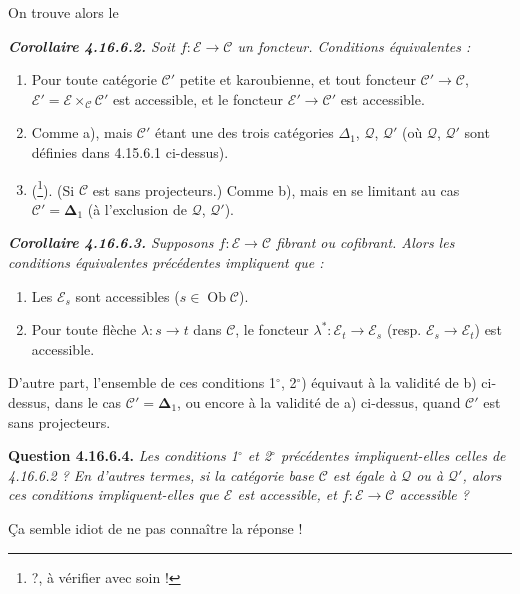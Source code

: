 \documentclass[11pt]{article}
\newcommand{\printedpage}[1]{\marginpar{\footnotesize p.~#1}}
\newcommand{\msp}[1]{\marginpar{\footnotesize [#1]}}
\newcommand{\Ob}{\operatorname{Ob}}
\newcommand{\cE}{\mathcal{E}}
\newcommand{\cC}{\mathcal{C}}
\newcommand{\cQ}{\mathcal{Q}}
\begin{document}
\setcounter{footnote}{195}

\printedpage{184}

\msp{page 475}
On trouve alors le

\begingroup\itshape
\noindent\textbf{\upshape Corollaire 4.16.6.2.} Soit $f : \cE \longrightarrow \cC$ un foncteur. Conditions équivalentes :
\begin{enumerate}[label={}]
\item[a)] Pour toute catégorie $\cC'$ \textup{petite} et \textup{karoubienne}, et tout foncteur $\cC' \longrightarrow \cC$, $\cE' = \cE \times_{\cC} \cC'$ est accessible, et le foncteur $\cE' \longrightarrow \cC'$ est accessible.
\item[b)] Comme a), mais $\cC'$ étant une des trois catégories $\Delta_1$, $\cQ$, $\cQ'$ (où $\cQ$, $\cQ'$ sont définies dans 4.15.6.1 ci-dessus).
\item[b$'$)] \textup{(}\footnote{?, à vérifier avec soin !}\textup{)}. (Si $\cC$ est sans projecteurs.) Comme b), mais en se limitant au cas $\cC' = \boldsymbol{\Delta}_1$ (à l'exclusion de $\cQ$, $\cQ'$).
\end{enumerate}
\endgroup

\begingroup\itshape
\noindent\textbf{\upshape Corollaire 4.16.6.3.} Supposons $f : \cE \longrightarrow \cC$ fibrant ou cofibrant. Alors les conditions équivalentes précédentes impliquent que :
\begin{enumerate}[label={}]
\item[1$^\circ$)] Les $\cE_s$ sont accessibles ($s \in \Ob \cC$).
\item[2$^\circ$)] Pour toute flèche $\lambda : s \longrightarrow t$ dans $\cC$, le foncteur $\lambda^* : \cE_t \longrightarrow \cE_s$ (resp. $\cE_s \longrightarrow \cE_t$) est accessible.
\end{enumerate}
\noindent D'autre part, l'ensemble de ces conditions 1$^\circ$, 2$^\circ$) équivaut à la validité de b) ci-dessus, dans le cas $\cC' = \boldsymbol{\Delta}_1$, ou encore à la validité
\msp{page 476}
de a) ci-dessus, quand $\cC'$ est \textup{sans projecteurs}.
\endgroup

\textbf{Question 4.16.6.4.} \textit{Les conditions 1$^\circ$ et 2$^\circ$ précédentes impliquent-elles celles de 4.16.6.2 ? En d'autres termes, si la catégorie base $\cC$ est égale à $\cQ$ ou à $\cQ'$, alors ces conditions impliquent-elles que $\cE$ est accessible, et $f : \cE \longrightarrow \cC$ accessible ?}

Ça semble idiot de ne pas connaître la réponse !
\end{document}
